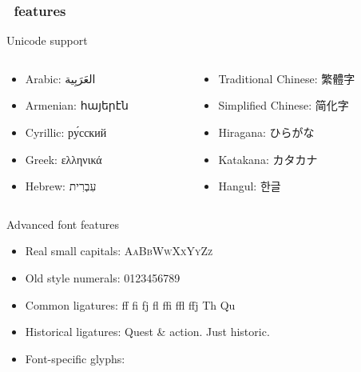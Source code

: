 \documentclass{beamer}                %
\begin{document}
\begin{frame}
\frametitle{\XeLaTeX \ features}
  \begin{exampleblock}{Unicode support}
  \begin{columns}[T]
  \begin{column}{.45\textwidth}
  \renewcommand{\baselinestretch}{0.9}
  \begin{itemize}
  \item Arabic: \textarabic{العَرَبِية‎}
  \item Armenian: { հայերէն }
  \item Cyrillic: ру́сский
  \item Greek: ελληνικά
  \item Hebrew: עִבְרִית
  \end{itemize}
  \end{column}
  \begin{column}{.55\textwidth}
  \renewcommand{\baselinestretch}{0.9}
  \begin{itemize}
  \item Traditional Chinese: 繁體字
  \item Simplified Chinese: 简化字 
  \item Hiragana: {\CJKnospace ひらがな}
  \item Katakana: カタカナ
  \item Hangul: { \CJKspace 한글}
  \end{itemize}
  \end{column}
  \end{columns}
\end{exampleblock}
\begin{exampleblock}{Advanced font features}
\renewcommand{\baselinestretch}{0.9}
\begin{itemize}
  \item Real small capitals: \textsc{AaBbWwXxYyZz}
  \item Old style numerals:  0123456789
  \item Common ligatures: ff fi fj fl ffi ffl ffj Th Qu
  \item Historical ligatures:  Quest \& action. Just historic.
  \item Font-specific glyphs:            
\end{itemize}
\end{exampleblock}
\end{frame}
\end{document}
